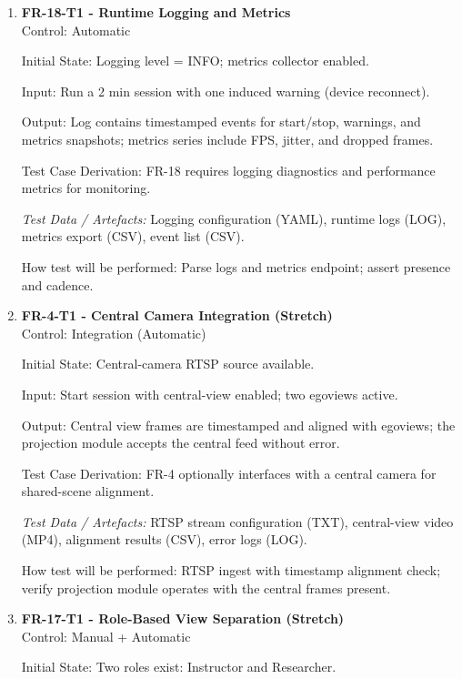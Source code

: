 \documentclass[12pt, titlepage]{article}
\begin{document}
\begin{enumerate}

\item \textbf{FR-18-T1 - Runtime Logging and Metrics} \\

Control: Automatic

Initial State: Logging level = INFO; metrics collector enabled.

Input: Run a 2 min session with one induced warning (device reconnect).

Output: Log contains timestamped events for start/stop, warnings, and metrics snapshots; metrics series include FPS, jitter, and dropped frames.

Test Case Derivation: FR-18 requires logging diagnostics and performance metrics for monitoring.

\textit{Test Data / Artefacts:} Logging configuration (YAML), runtime logs (LOG), metrics export (CSV), event list (CSV).

How test will be performed: Parse logs and metrics endpoint; assert presence and cadence.

\item \textbf{FR-4-T1 - Central Camera Integration (Stretch)} \\

Control: Integration (Automatic)

Initial State: Central-camera RTSP source available.

Input: Start session with central-view enabled; two egoviews active.

Output: Central view frames are timestamped and aligned with egoviews; the projection module accepts the central feed without error.

Test Case Derivation: FR-4 optionally interfaces with a central camera for shared-scene alignment.

\textit{Test Data / Artefacts:} RTSP stream configuration (TXT), central-view video (MP4), alignment results (CSV), error logs (LOG).

How test will be performed: RTSP ingest with timestamp alignment check; verify projection module operates with the central frames present.

\item \textbf{FR-17-T1 - Role-Based View Separation (Stretch)} \\

Control: Manual + Automatic

Initial State: Two roles exist: Instructor and Researcher.


\end{enumerate}
\end{document}
